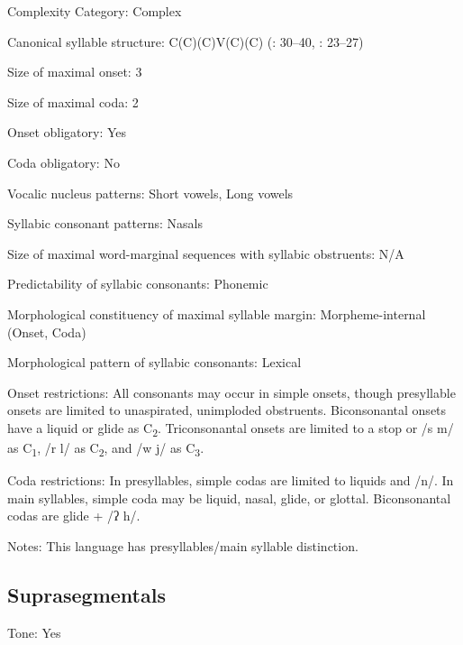 {\begin{appendixdesc}
\item[Complexity Category:] Complex

\item[Canonical syllable structure:] C(C)(C)V(C)(C) (\citealt{Olsen2014}: 30--40, \citealt{Manley1972}: 23--27)

\item[Size of maximal onset:] 3

\item[Size of maximal coda:] 2

\item[Onset obligatory:] Yes

\item[Coda obligatory:] No

\item[Vocalic nucleus patterns:] Short vowels, Long vowels

\item[Syllabic consonant patterns:] Nasals

\item[Size of maximal word-marginal sequences with syllabic obstruents:] N/A

\item[Predictability of syllabic consonants:] Phonemic

\item[Morphological constituency of maximal syllable margin:] Morpheme-internal (Onset, Coda)

\item[Morphological pattern of syllabic consonants:] Lexical

\item[Onset restrictions:] All consonants may occur in simple onsets, though presyllable onsets are limited to unaspirated, unimploded obstruents. Biconsonantal onsets have a liquid or glide as C\textsubscript{2}. Triconsonantal onsets are limited to a stop or /s m/ as C\textsubscript{1}, /r l/ as C\textsubscript{2}, and /w j/ as C\textsubscript{3}.

\item[Coda restrictions:] In presyllables, simple codas are limited to liquids and /n/. In main syllables, simple coda may be liquid, nasal, glide, or glottal. Biconsonantal codas are glide + /ʔ h/.

\item[Notes:] This language has presyllables/main syllable distinction.
\end{appendixdesc}
\subsection*{Suprasegmentals}
\begin{appendixdesc}
\item[Tone:] Yes


\end{appendixdesc}}
